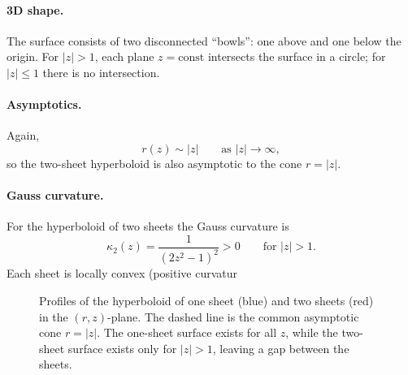 \documentclass[12pt,a4paper]{article}
\theoremstyle{plain}
\theoremstyle{definition}      %
\begin{document}
\paragraph{3D shape.}
The surface consists of two disconnected ``bowls'': one above and one
below the origin. For $|z|>1$, each plane $z=\text{const}$ intersects the
surface in a circle; for $|z|\le 1$ there is no intersection.

\paragraph{Asymptotics.}
Again,
\[
r(z) \sim |z| \qquad \text{as } |z|\to\infty,
\]
so the two-sheet hyperboloid is also asymptotic to the cone $r=|z|$.

\paragraph{Gauss curvature.}
For the hyperboloid of two sheets the Gauss curvature is
\[
\kappa_2(z) = \frac{1}{(2z^2-1)^2} > 0 \qquad \text{for } |z|>1.
\]
Each sheet is locally convex (positive curvatur

\begin{figure}[h]
	\centering
	\caption{Profiles of the hyperboloid of one sheet (blue) and two sheets
		(red) in the $(r,z)$-plane. The dashed line is the common asymptotic cone
		$r=|z|$. The one-sheet surface exists for all $z$, while the two-sheet
		surface exists only for $|z|>1$, leaving a gap between the sheets.}
	\label{fig:hyperboloid-profile-comparison}
\end{figure}
\end{document}
